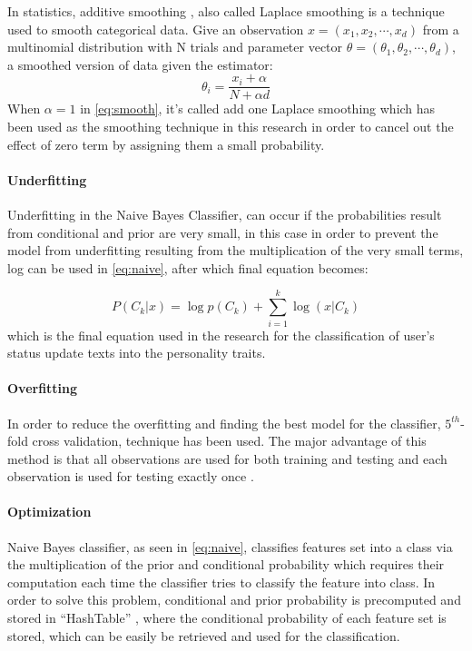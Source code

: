 \documentclass[journal]{IEEEtran}
\begin{document}
In statistics, additive smoothing \cite{additive}, also called Laplace smoothing is a technique used to smooth categorical data. Give an observation $x = (x_1,x_2,\cdots,x_d)$ from a multinomial distribution with N trials and parameter vector $\theta = (\theta_1,\theta_2,\cdots,\theta_d)$, a smoothed version of data given the estimator:\\
\begin{equation}\label{eq:smooth}
  \theta_i = \frac{x_i + \alpha}{N+ \alpha d}
\end{equation}
When $\alpha = 1 $ in \ref{eq:smooth}, it's called add one Laplace smoothing which has been used as the smoothing technique in this research in order to cancel out the effect of zero term by assigning them a small probability.

\paragraph{Underfitting}

Underfitting \cite{naive} in the Naive Bayes Classifier, can occur if the probabilities result from conditional and prior are very small, in this case in order to prevent the model from underfitting resulting from the multiplication of the very small terms, log can be used in \ref{eq:naive}, after which final equation becomes:

\begin{equation}
P(C_k|x) = \log p(C_k) + \sum_{i=1}^{k} \log(x|C_k)
\end{equation}
which is the final equation used in the research for the classification of user's status update texts into the personality traits.

\paragraph{Overfitting}

In order to reduce the overfitting and finding the best model for the classifier, $5^{th}$-fold cross validation, technique has been used. The major advantage of this method is that all observations are used for both training and testing and each observation is used for testing exactly once \cite{cross}.

\paragraph{Optimization}

Naive Bayes classifier, as seen in \ref{eq:naive}, classifies features set into a class via the multiplication of the prior and conditional probability which requires their computation each time the classifier tries to classify the feature into class. In order to solve this problem, conditional and prior probability is precomputed and stored in ``HashTable'' \cite{naive}, where the conditional probability of each feature set is stored, which can be easily be retrieved and used for the classification.
\end{document}
